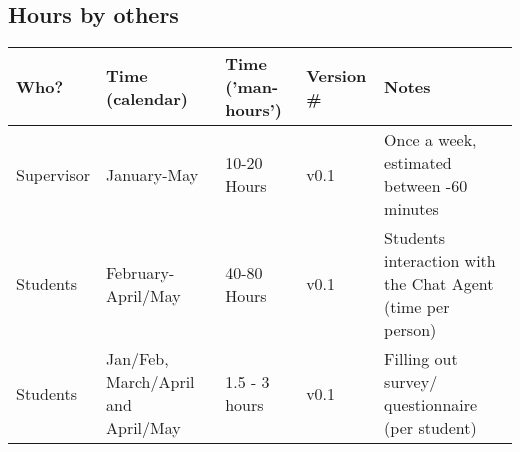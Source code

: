 \subsection{Hours by others}
\label{chapter5:hours_needed_by_others}
\begin{center}
	\begin{tabular}[H]{| p{4cm} | p{2.5cm} | l |  l | p{4cm}|}
		\hline
		Who? & Time (calendar) & Time ('man-hours')\footnotemark & Version \# & Notes  \\
		\hline
		Supervisor & January-May & 10-20 Hours & v0.1 & Once a week, \newline estimated between \newline 30-60 minutes \\ 
		\hline
		Students & February-April/May & 40-80 Hours & v0.1 & Students interaction \newline with the Chat Agent \newline (time per person) \\ 
		\hline
		Students & Jan/Feb, March/April and April/May & 1.5 - 3 hours & v0.1 & Filling out survey/ \newline questionnaire \newline (per student) \\ 
		\hline
	\end{tabular}
\end{center}
